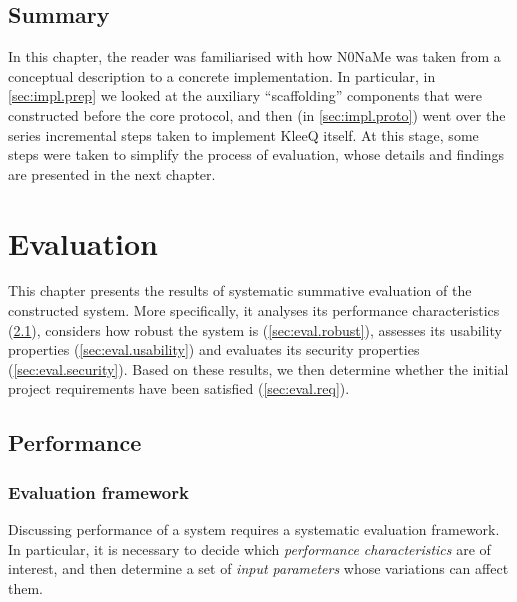 \documentclass[a4paper, twoside, 12pt]{report}
\newcommand{\funkytt}{\fontfamily{AnonymousPro}\selectfont}
\begin{document}
\section{Summary}
In this chapter, the reader was familiarised with how {\funkytt N0NaMe} was taken from a conceptual description to a concrete implementation. In particular, in \cref{sec:impl.prep} we looked at the auxiliary ``scaffolding'' components that were constructed before the core protocol, and then (in \cref{sec:impl.proto}) went over the series incremental steps taken to implement KleeQ itself. At this stage, some steps were taken to simplify the process of evaluation, whose details and findings are presented in the next chapter.

\chapter{Evaluation}
This chapter presents the results of systematic summative evaluation of the constructed system. More specifically, it analyses its performance characteristics (\cref{sec:eval.perf}), considers how robust the system is (\cref{sec:eval.robust}), assesses its usability properties (\cref{sec:eval.usability}) and evaluates its security properties (\cref{sec:eval.security}). Based on these results, we then determine whether the initial project requirements have been satisfied (\cref{sec:eval.req}).


\section{Performance}
\label{sec:eval.perf}
\subsection{Evaluation framework}
\label{subsec:eval.pef.frame}
Discussing performance of a system requires a systematic evaluation framework. 
In particular, it is necessary to decide which \emph{performance characteristics} are of interest, and then determine a set of \emph{input parameters} whose variations can affect them. \\
\end{document}
